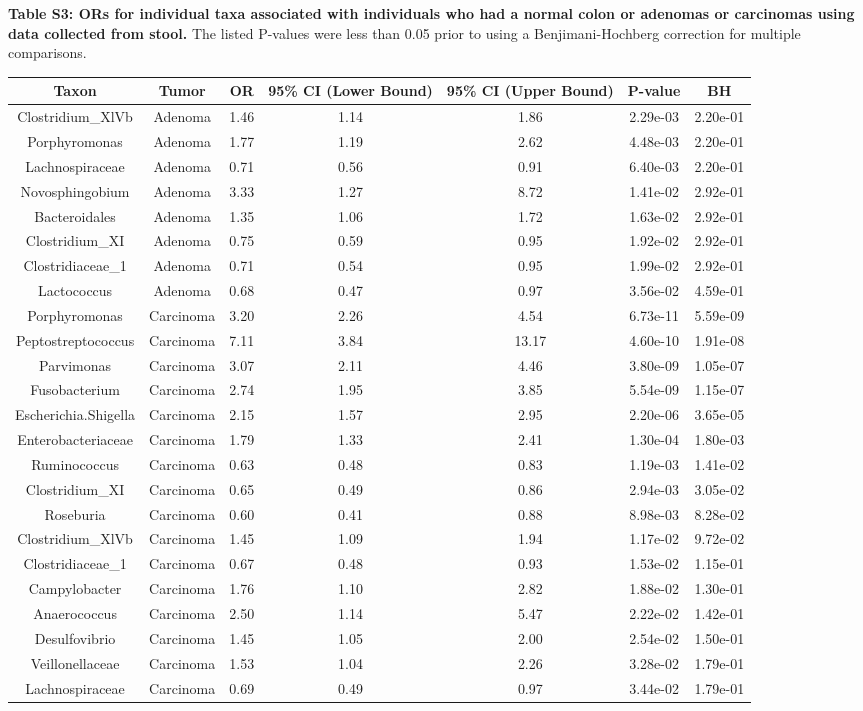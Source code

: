 \documentclass[12pt,]{article}
\begin{document}
\newpage

\textbf{Table S3: ORs for individual taxa associated with individuals
who had a normal colon or adenomas or carcinomas using data collected
from stool.} The listed P-values were less than 0.05 prior to using a
Benjimani-Hochberg correction for multiple comparisons.

\scriptsize

\begin{longtable}[]{@{}ccccccc@{}}
\toprule
Taxon & Tumor & OR & 95\% CI (Lower Bound) & 95\% CI (Upper Bound) &
P-value & BH\tabularnewline
\midrule
\endhead
Clostridium\_XlVb & Adenoma & 1.46 & 1.14 & 1.86 & 2.29e-03 &
2.20e-01\tabularnewline
Porphyromonas & Adenoma & 1.77 & 1.19 & 2.62 & 4.48e-03 &
2.20e-01\tabularnewline
Lachnospiraceae & Adenoma & 0.71 & 0.56 & 0.91 & 6.40e-03 &
2.20e-01\tabularnewline
Novosphingobium & Adenoma & 3.33 & 1.27 & 8.72 & 1.41e-02 &
2.92e-01\tabularnewline
Bacteroidales & Adenoma & 1.35 & 1.06 & 1.72 & 1.63e-02 &
2.92e-01\tabularnewline
Clostridium\_XI & Adenoma & 0.75 & 0.59 & 0.95 & 1.92e-02 &
2.92e-01\tabularnewline
Clostridiaceae\_1 & Adenoma & 0.71 & 0.54 & 0.95 & 1.99e-02 &
2.92e-01\tabularnewline
Lactococcus & Adenoma & 0.68 & 0.47 & 0.97 & 3.56e-02 &
4.59e-01\tabularnewline
Porphyromonas & Carcinoma & 3.20 & 2.26 & 4.54 & 6.73e-11 &
5.59e-09\tabularnewline
Peptostreptococcus & Carcinoma & 7.11 & 3.84 & 13.17 & 4.60e-10 &
1.91e-08\tabularnewline
Parvimonas & Carcinoma & 3.07 & 2.11 & 4.46 & 3.80e-09 &
1.05e-07\tabularnewline
Fusobacterium & Carcinoma & 2.74 & 1.95 & 3.85 & 5.54e-09 &
1.15e-07\tabularnewline
Escherichia.Shigella & Carcinoma & 2.15 & 1.57 & 2.95 & 2.20e-06 &
3.65e-05\tabularnewline
Enterobacteriaceae & Carcinoma & 1.79 & 1.33 & 2.41 & 1.30e-04 &
1.80e-03\tabularnewline
Ruminococcus & Carcinoma & 0.63 & 0.48 & 0.83 & 1.19e-03 &
1.41e-02\tabularnewline
Clostridium\_XI & Carcinoma & 0.65 & 0.49 & 0.86 & 2.94e-03 &
3.05e-02\tabularnewline
Roseburia & Carcinoma & 0.60 & 0.41 & 0.88 & 8.98e-03 &
8.28e-02\tabularnewline
Clostridium\_XlVb & Carcinoma & 1.45 & 1.09 & 1.94 & 1.17e-02 &
9.72e-02\tabularnewline
Clostridiaceae\_1 & Carcinoma & 0.67 & 0.48 & 0.93 & 1.53e-02 &
1.15e-01\tabularnewline
Campylobacter & Carcinoma & 1.76 & 1.10 & 2.82 & 1.88e-02 &
1.30e-01\tabularnewline
Anaerococcus & Carcinoma & 2.50 & 1.14 & 5.47 & 2.22e-02 &
1.42e-01\tabularnewline
Desulfovibrio & Carcinoma & 1.45 & 1.05 & 2.00 & 2.54e-02 &
1.50e-01\tabularnewline
Veillonellaceae & Carcinoma & 1.53 & 1.04 & 2.26 & 3.28e-02 &
1.79e-01\tabularnewline
Lachnospiraceae & Carcinoma & 0.69 & 0.49 & 0.97 & 3.44e-02 &
1.79e-01\tabularnewline
\bottomrule
\end{longtable}
\end{document}
